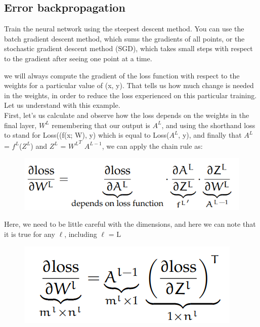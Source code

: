 \subsection{Error backpropagation}
Train the neural network using the steepest descent method. You can use the batch gradient descent method, which sums the gradients of all points, or the  stochastic gradient descent method (SGD), which takes small steps with respect to the gradient after seeing one point at a time\cite{10.5555/2968826.2968922}.

we will always compute the gradient of the loss function with respect
to the weights for a particular value of (x, y)\cite{10.5555/2968826.2968922, https://doi.org/10.48550/arxiv.1811.03378, https://doi.org/10.48550/arxiv.1506.00619}. That tells us how much change is needed in the
weights, in order to reduce the loss experienced on this particular training. Let us understand with this example.\\
First, let’s us calculate and observe how the loss depends on the weights in the final layer, $W^L$ remembering
that our output is $A^L$, and using the shorthand loss to stand for Loss((f(x; W), y) which
is equal to Loss($A^L$, y), and finally that $A^L$ = $f^L$($Z^L$) and $Z^L$ = ${W^L}^T$ $A^{L-1}$, we can apply the chain  rule as:
\begin{figure}[H]
    \centering
    \includegraphics[scale = 0.3]{Figure/ml__6.png}
    \label{fig:my_label}
\end{figure}
Here, we need to be little careful with the dimensions, and here we can note that it is true for any $ \ell$, including $ \ell$ = L\\
\begin{figure}[H]
    \centering
    \includegraphics[scale=0.3]{Figure/ml__7.png}
\end{figure}
